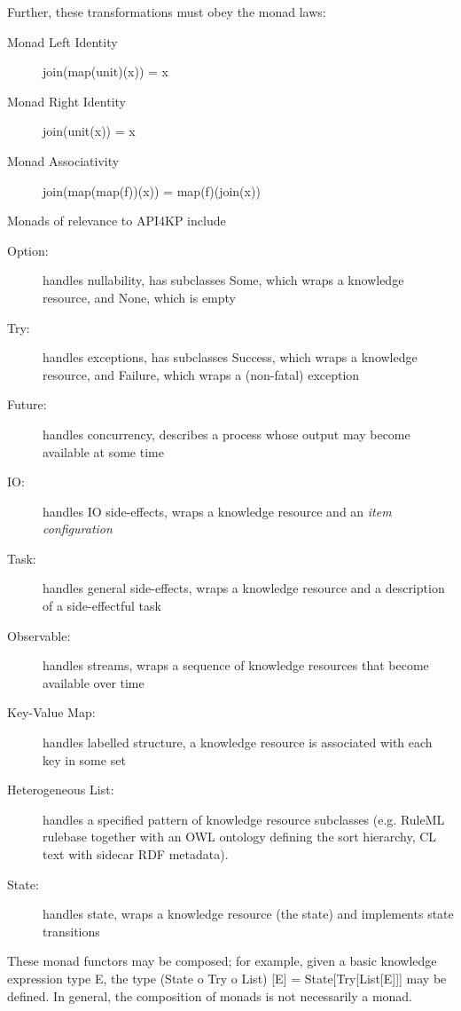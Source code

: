 \documentclass[runningheads]{llncs}
\begin{document}
Further, these transformations must obey the monad laws:
\begin{description}
\item[Monad Left Identity] join(map(unit)(x)) = x
\item[Monad Right Identity] join(unit(x)) = x
\item[Monad Associativity] join(map(map(f))(x)) = map(f)(join(x))
\end{description}

Monads of relevance to API4KP include
\begin{description}
\item [Option:] handles nullability, has subclasses Some, which wraps a knowledge resource, and None, which is empty
\item [Try:] handles exceptions, has subclasses Success, which wraps a knowledge resource, and Failure, which wraps a (non-fatal) exception
\item [Future:] handles concurrency, describes a process whose output may become available at some time
\item [IO:] handles IO side-effects, wraps a knowledge resource and an \emph{item configuration}
\item [Task:] handles general side-effects, wraps a knowledge resource and a description of a side-effectful task
\item [Observable:] handles streams, wraps a sequence of knowledge resources that become available over time
\item [Key-Value Map:] handles labelled structure, a knowledge resource is associated with each key in some set
\item [Heterogeneous List:] handles a specified pattern of knowledge resource subclasses (e.g. RuleML rulebase together with an OWL ontology defining the sort hierarchy, CL text with sidecar RDF metadata).
\item [State:] handles state, wraps a knowledge resource (the state) and implements state transitions
\end{description}
These monad functors may be composed; for example, given a basic knowledge expression type E, the type (State o Try o List) [E] = State[Try[List[E]]] may be defined.
In general, the composition of monads is not necessarily a monad. 
\end{document}
